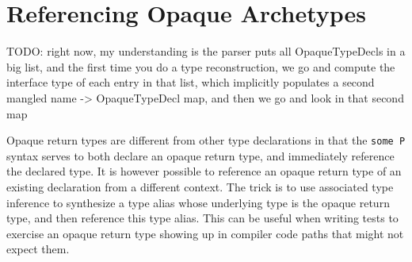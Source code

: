 \documentclass[../generics]{subfiles}
\begin{document}
\fi

\section[]{Referencing Opaque Archetypes}\label{reference opaque archetype}

\ifWIP

TODO: right now, my understanding is the parser puts all OpaqueTypeDecls in a big list, and the first time you do a type reconstruction, we go and compute the interface type of each entry in that list, which implicitly populates a second mangled name -> OpaqueTypeDecl map, and then we go and look in that second map

Opaque return types are different from other type declarations in that the \texttt{some P} syntax serves to both declare an opaque return type, and immediately reference the declared type. It is however possible to reference an opaque return type of an existing declaration from a different context. The trick is to use associated type inference to synthesize a type alias whose underlying type is the opaque return type, and then reference this type alias. This can be useful when writing tests to exercise an opaque return type showing up in compiler code paths that might not expect them.
\end{document}
